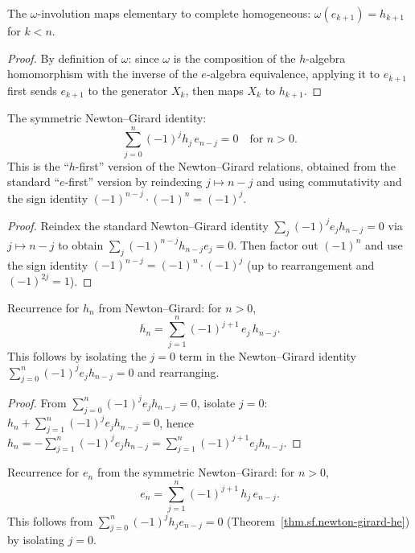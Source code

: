 \begin{theorem}
\label{thm.sf.omega-esymm}
\leanhelper
\leanok
The $\omega$-involution maps elementary to complete homogeneous:
$\omega(e_{k+1}) = h_{k+1}$ for $k < n$.
\end{theorem}

\begin{proof}
\leanok
By definition of $\omega$: since $\omega$ is the composition of the $h$-algebra
homomorphism with the inverse of the $e$-algebra equivalence, applying it
to $e_{k+1}$ first sends $e_{k+1}$ to the generator $X_k$, then maps
$X_k$ to $h_{k+1}$.
\end{proof}

\begin{theorem}
\label{thm.sf.newton-girard-he}
\leanhelper
\leanok
The symmetric Newton--Girard identity:
\[
\sum_{j=0}^{n} (-1)^j h_j \, e_{n-j} = 0 \quad \text{for } n > 0.
\]
This is the ``$h$-first'' version of the Newton--Girard relations,
obtained from the standard ``$e$-first'' version by reindexing $j \mapsto n - j$
and using commutativity and the sign identity $(-1)^{n-j} \cdot (-1)^n = (-1)^j$.
\end{theorem}

\begin{proof}
Reindex the standard Newton--Girard identity $\sum_j (-1)^j e_j h_{n-j} = 0$
via $j \mapsto n - j$ to obtain $\sum_j (-1)^{n-j} h_{n-j} e_j = 0$.
Then factor out $(-1)^n$ and use the sign identity
$(-1)^{n-j} = (-1)^n \cdot (-1)^j$ (up to rearrangement and
$(-1)^{2j} = 1$).
\end{proof}

\begin{lemma}
\label{lem.sf.hsymm-recurrence}
\leanhelper
\leanok
Recurrence for $h_n$ from Newton--Girard: for $n > 0$,
\[
h_n = \sum_{j=1}^{n} (-1)^{j+1}\, e_j \, h_{n-j}.
\]
This follows by isolating the $j = 0$ term in the Newton--Girard identity
$\sum_{j=0}^n (-1)^j e_j h_{n-j} = 0$ and rearranging.
\end{lemma}

\begin{proof}
From $\sum_{j=0}^n (-1)^j e_j h_{n-j} = 0$, isolate $j = 0$:
$h_n + \sum_{j=1}^n (-1)^j e_j h_{n-j} = 0$, hence
$h_n = -\sum_{j=1}^n (-1)^j e_j h_{n-j} = \sum_{j=1}^n (-1)^{j+1} e_j h_{n-j}$.
\end{proof}

\begin{lemma}
\label{lem.sf.esymm-recurrence}
\leanhelper
\leanok
Recurrence for $e_n$ from the symmetric Newton--Girard: for $n > 0$,
\[
e_n = \sum_{j=1}^{n} (-1)^{j+1}\, h_j \, e_{n-j}.
\]
This follows from $\sum_{j=0}^n (-1)^j h_j e_{n-j} = 0$
(Theorem~\ref{thm.sf.newton-girard-he}) by isolating $j = 0$.
\end{lemma}

